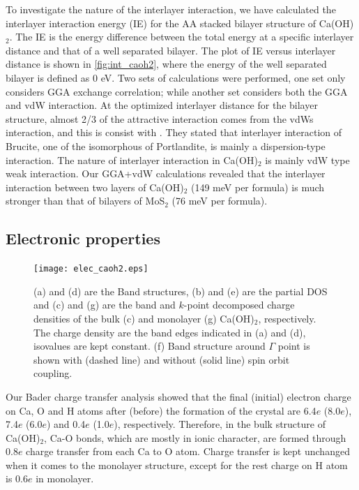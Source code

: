 To investigate the nature of the interlayer interaction, we 
have calculated the interlayer interaction energy (IE) for the AA stacked 
bilayer structure of Ca(OH)$_2$. The IE is the energy difference between the 
total energy at a specific interlayer distance and that of a well
separated bilayer. The plot of IE versus interlayer distance is shown in \autoref{fig:int_caoh2}, where the energy of the  well separated bilayer is defined as 
0 eV. Two sets of calculations were performed, one set only considers GGA 
exchange correlation; while another set considers both the GGA and vdW 
interaction. At the optimized interlayer distance for the bilayer structure, 
almost 2/3 of the attractive interaction comes from the vdWs 
interaction, and this is consist with \citet{DArco1993} . They stated that
interlayer interaction of Brucite, one of the isomorphous of Portlandite, is
mainly a dispersion-type interaction. The nature of interlayer interaction in Ca(OH)$_2$ is mainly vdW type weak interaction. Our GGA+vdW calculations revealed that the interlayer interaction between two layers of Ca(OH)$_2$ (149 meV per formula) is much stronger than that of bilayers of MoS$_2$ (76 meV per formula).


\subsection{Electronic properties}\label{sec:electronic}

\begin{figure}[htbp]
\centering
\texttt{[image: elec\_caoh2.eps]}
\caption{\label{fig:elec_caoh2} (a) and (d) are the Band structures, 
(b) and (e) are the partial DOS and (c) and (g) are the band and $k$-point decomposed charge densities of the bulk (c) and monolayer (g) Ca(OH)$_2$, respectively. The charge density are the band edges indicated in (a) and (d), isovalues are kept constant. (f) Band structure around $\Gamma$ point is shown with (dashed line) and without (solid line) spin orbit coupling. }
\end{figure}

Our Bader charge transfer analysis showed that the final (initial) electron 
charge on Ca, O and H atoms after (before) the formation of the crystal are 
6.4$e$ (8.0$e$), 7.4$e$ (6.0$e$) and 0.4$e$ (1.0$e$), respectively. Therefore, 
in the bulk structure of Ca(OH)$_2$, Ca-O bonds, which are 
mostly in ionic character, are formed through 0.8$e$ charge transfer 
from each Ca to O atom.  Charge transfer is kept unchanged when it comes to the monolayer structure, except for the rest charge on H atom is 0.6$e$ in monolayer.

